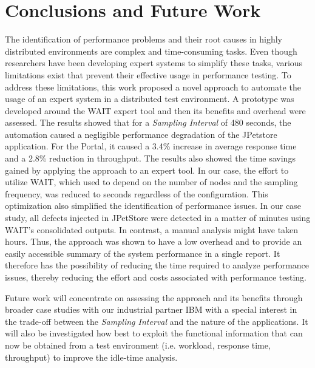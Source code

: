 \documentclass[runningheads,a4paper]{llncs}
\begin{document}
\section{Conclusions and Future Work}
\label{Conclusions}
\vspace{-7pt}

The identification of performance problems and their root causes in highly
distributed environments are complex and time-consuming tasks. Even though
researchers have been developing expert systems to simplify these tasks, various
limitations exist that prevent their effective usage in performance testing. To
address these limitations, this work proposed a novel approach to automate the usage of 
an expert system in a distributed test environment. A prototype was developed
around the WAIT expert tool and then its benefits and overhead were assessed.
The results showed that for a \emph{Sampling Interval} of 480 seconds, the automation
caused a negligible performance degradation of the JPetstore application. For the Portal,
it caused a 3.4\% increase in average response time and a 2.8\% reduction in
throughput. The results also showed the time savings gained by applying the
approach to an expert tool. In our case, the effort to utilize WAIT, which used
to depend on the number of nodes and the sampling frequency, was
reduced to seconds regardless of the configuration. This optimization also
simplified the identification of performance issues. In our case study, all
defects injected in JPetStore were detected in a matter of minutes using WAIT's
consolidated outputs. In contrast, a manual analysis might have taken hours.
Thus, the approach was shown to have a low overhead and to provide an easily
accessible summary of the system performance in a single report. It therefore
has the possibility of reducing the time required to analyze performance issues,
thereby reducing the effort and costs associated with performance testing.

Future work will concentrate on assessing the approach and its benefits through
broader case studies with our industrial partner IBM with a special interest in 
the trade-off between the \emph{Sampling Interval} and the nature of the
applications.  It will also be investigated how best to exploit the
functional information that can now be obtained from a test environment (i.e.
workload, response time, throughput) to improve the idle-time analysis.


\vspace{-8pt}
\end{document}
